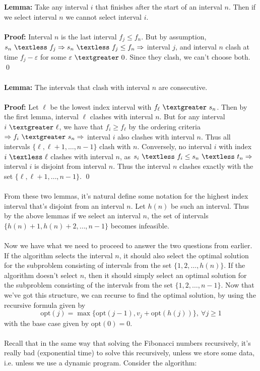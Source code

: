 \documentclass{article}
\newcommand{\ep}{\varepsilon}
\newcommand{\lt}{\textless}
\newcommand{\gt}{\textgreater}
\newcommand{\imply}{\Rightarrow}
\newcommand{\lem}{\textbf{Lemma: }}
\newcommand{\proo}{\textbf{Proof: }}
\newcommand{\opt}{\text{opt}}
\begin{document}
\lem Take any interval $i$ that finishes after the start of an interval $n$. Then if we select interval $n$ we cannot select interval $i$.\\\\
\proo Interval $n$ is the last interval $f_j \leq f_n$. But by assumption, $s_n\ \lt\ f_j \imply s_n\ \lt\ f_j \leq f_n \imply$ interval $j$, and interval $n$ clash at time $f_j - \ep$ for some $\ep\ \gt\ 0$. Since they clash, we can't choose both.
\qed\\\\
\lem The intervals that clash with interval $n$ are consecutive.\\\\
\proo Let $\ell$ be the lowest index interval with $f_{\ell}\ \gt\ s_n$. Then by the first lemma, interval $\ell$ clashes with interval $n$. But for any interval $i\ \gt\ \ell$, we have that $f_i \geq f_{\ell}$ by the ordering criteria $\imply f_i\ \gt\ s_n \imply$ interval $i$ also clashes with interval $n$. Thus all intervals $\{\ell, \ell +1, \dots, n-1\}$ clash with $n$. Conversely, no interval $i$ with index $i\ \lt\ \ell$ clashes with interval $n$, as $s_i\ \lt\ f_i \leq s_n\ \lt\ t_n \imply$ interval $i$ is disjoint from interval $n$. Thus the interval $n$ clashes exactly with the set $\{\ell, \ell + 1, \dots, n-1\}$.
\qed\\\\
From these two lemmas, it's natural define some notation for the highest index interval that's disjoint from an interval $n$. Let $h(n)$ be such an interval. Thus by the above lemmas if we select an interval $n$, the set of intervals $\{h(n)+1 , h(n)+2, \dots, n-1\}$ becomes infeasible.\\\\
Now we have what we need to proceed to answer the two questions from earlier. If the algorithm selects the interval $n$, it should also select the optimal solution for the subproblem consisting of intervals from the set $\{1, 2, \dots, h(n)\}$. If the algorithm doesn't select $n$, then it should simply select an optimal solution for the subproblem consisting of the intervals from the set $\{1, 2, \dots, n-1\}$. Now that we've got this structure, we can recurse to find the optimal solution, by using the recursive formula given by
\[\opt(j) = \max\{\opt(j-1), v_j + \opt(h(j))\},\ \forall j \geq 1\]
with the base case given by $\opt(0) = 0$.\\\\
Recall that in the same way that solving the Fibonacci numbers recursively, it's really bad (exponential time) to solve this recursively, unless we store some data, i.e. unless we use a dynamic program. Consider the algorithm:\\\\
\end{document}
